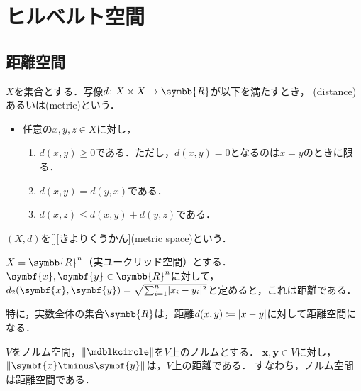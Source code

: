 \documentclass{sotsu}
\begin{document}
\tableofcontents










\section{ヒルベルト空間}

\subsection{距離空間}

\begin{definition}[距離]
    \label{dfn:distance}
    $X$を集合とする．写像$d \colon X \times X \to \symbb{R}$が以下を満たすとき，
    (distance)あるいは(metric)という．
    \begin{itemize}
        \item 任意の$x, y, z \in X$に対し，
        \begin{enumerate}
            \item $d(x, y) \geq 0$である．ただし，$d(x, y) = 0$となるのは$x = y$のときに限る．
            \item $d(x, y) = d(y, x)$である．
            \item $d(x, z) \leq d(x, y) + d(y, z)$である．
        \end{enumerate}
    \end{itemize}
    $(X, d)$を[][きよりくうかん](metric space)という．
\end{definition}


\begin{example}
    $X = \symbb{R}^n$（実ユークリッド空間）とする．
    $\symbf{x}, \symbf{y} \in \symbb{R}^n$に対して，
    $d_2 (\symbf{x}, \symbf{y}) = \sqrt{ \sum_{i = 1}^{n} \abs{x_i - y_i}^2 }$と定めると，これは距離である．

    特に，実数全体の集合$\symbb{R}$は，距離$d(x, y) \coloneq \lvert x - y\rvert$に対して距離空間になる．
\end{example}

\begin{proposition}
    \label{thm:norm-is-distance}
    $V$をノルム空間，$\norm{\bigdot}$を$V$上のノルムとする．
    $\symbf{x}, \symbf{y} \in V$に対し，$\norm{\symbf{x} \tminus \symbf{y}}$は，$V$上の距離である．
    すなわち，ノルム空間は距離空間である．
\end{proposition}
\end{document}
